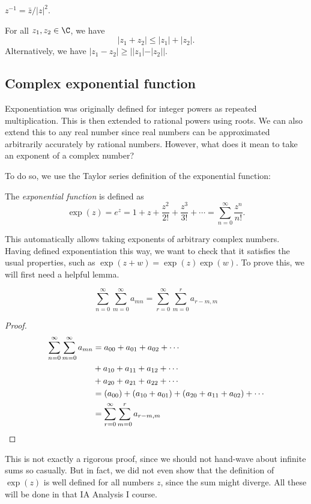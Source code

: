 \documentclass[a4paper]{article}
\begin{document}
\begin{prop}
  $z^{-1} = \bar{z}/|z|^2$.
\end{prop}

\begin{thm}
  For all $z_1, z_2 \in \C$, we have
  \[
    |z_1 + z_2| \leq |z_1| + |z_2|.
  \]
  Alternatively, we have $|z_1 - z_2|\geq ||z_1| - |z_2||$.
\end{thm}

\subsection{Complex exponential function}
Exponentiation was originally defined for integer powers as repeated multiplication. This is then extended to rational powers using roots. We can also extend this to any real number since real numbers can be approximated arbitrarily accurately by rational numbers. However, what does it mean to take an exponent of a complex number?

To do so, we use the Taylor series definition of the exponential function:
\begin{defi}
  The \emph{exponential function} is defined as
  \[
    \exp (z) = e^z = 1 + z + \frac{z^2}{2!} + \frac{z^3}{3!} + \cdots = \sum_{n = 0}^\infty \frac{z^n}{n!}.
  \]
\end{defi}
This automatically allows taking exponents of arbitrary complex numbers. Having defined exponentiation this way, we want to check that it satisfies the usual properties, such as $\exp(z + w) = \exp(z)\exp(w)$. To prove this, we will first need a helpful lemma.

\begin{lemma}
  \[
    \sum_{n = 0}^\infty\sum_{m = 0}^\infty a_{mn} = \sum_{r = 0}^\infty\sum_{m = 0}^r a_{r - m, m}
  \]
\end{lemma}

\begin{proof}
  \begin{align*}
    \sum_{n = 0}^\infty\sum_{m = 0}^\infty a_{mn} &= a_{00} + a_{01} + a_{02} + \cdots\\
    &+ a_{10} + a_{11} + a_{12} + \cdots\\
    &+ a_{20} + a_{21} + a_{22} + \cdots\\
    &= (a_{00}) + (a_{10} + a_{01}) + (a_{20} + a_{11} + a_{02}) + \cdots\\
    &= \sum_{r = 0}^\infty\sum_{m = 0}^r a_{r - m, m} \qedhere
  \end{align*}
\end{proof}
This is not exactly a rigorous proof, since we should not hand-wave about infinite sums so casually. But in fact, we did not even show that the definition of $\exp(z)$ is well defined for all numbers $z$, since the sum might diverge. All these will be done in that IA Analysis I course.
\end{document}
